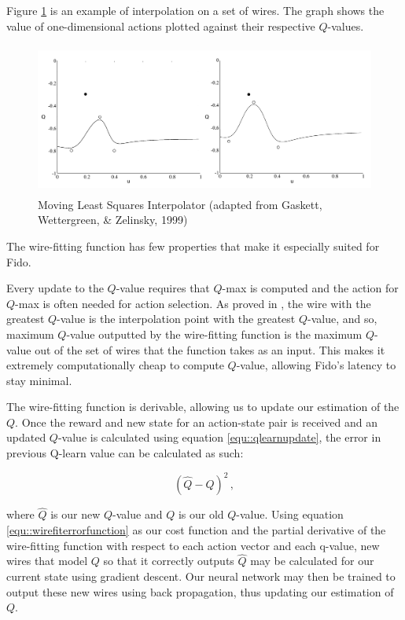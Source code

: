 Figure \ref{fig::wirefitexample} is an example of interpolation on a set of wires. The graph shows the value of one-dimensional actions plotted against their respective $Q$-values.

\begin{figure}[ht]
    \centering
    \includegraphics[height=5cm]{Figures/WireFit.png}
	\caption{Moving Least Squares Interpolator (adapted from Gaskett, Wettergreen, \& Zelinsky, 1999)}
    \label{fig::wirefitexample}
\end{figure}

The wire-fitting function has few properties that make it especially suited for Fido.

Every update to the $Q$-value requires that $Q$-max is computed and the action for $Q$-max is often needed for action selection. As proved in \cite{baird}, the wire with the greatest $Q$-value is the interpolation point with the greatest $Q$-value, and so, maximum $Q$-value outputted by the wire-fitting function is the maximum $Q$-value out of the set of wires that the function takes as an input. This makes it extremely computationally cheap to compute $Q$-value, allowing Fido's latency to stay minimal.

The wire-fitting function is derivable, allowing us to update our estimation of the $Q$. Once the reward and new state for an action-state pair is received and an updated $Q$-value is calculated using equation \ref{equ::qlearnupdate}, the error in previous Q-learn value can be calculated as such:

\begin{equation}
	(\hat{Q} - Q)^2
	\,,
	\label{equ::wirefiterrorfunction}
\end{equation}

where $\hat{Q}$ is our new $Q$-value and $Q$ is our old $Q$-value. Using equation \ref{equ::wirefiterrorfunction} as our cost function and the partial derivative of the wire-fitting function with respect to each action vector and each q-value, new wires that model $Q$ so that it correctly outputs $\hat{Q}$ may be calculated for our current state using gradient descent. Our neural network may then be trained to output these new wires using back propagation, thus updating our estimation of $Q$.

